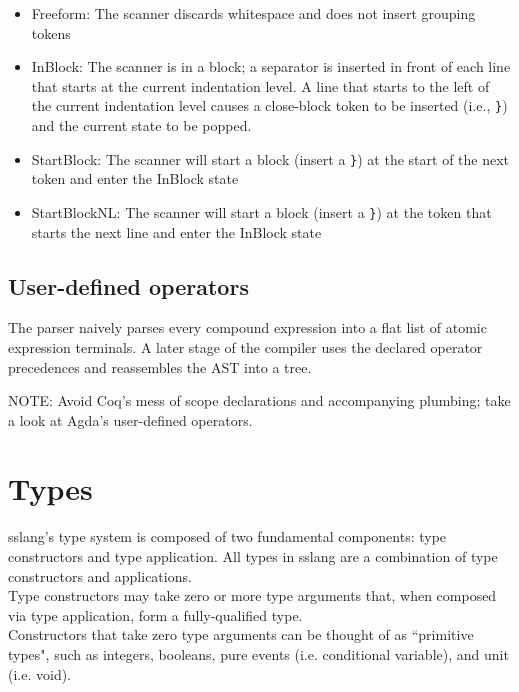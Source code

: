 \documentclass{article}
\begin{document}
\begin{itemize}

\item Freeform: The scanner discards whitespace and does not insert
  grouping tokens

\item InBlock: The scanner is in a block; a separator is inserted in
  front of each line that starts at the current indentation level.  A
  line that starts to the left of the current indentation level causes
  a close-block token to be inserted (i.e., \texttt{\}}) and the
    current state to be popped.

\item StartBlock: The scanner will start a block (insert a \texttt{\}})
at the start of the next token and enter the InBlock state
\item StartBlockNL: The scanner will start a block (insert a
  \texttt{\}}) at the token that starts the next line and enter the InBlock
    state

\end{itemize}

\subsection{User-defined operators}

The parser naively parses every compound expression into a flat list of atomic
expression terminals. A later stage of the compiler uses the declared operator
precedences and reassembles the AST into a tree.

NOTE: Avoid Coq's mess of scope declarations and accompanying plumbing; take
a look at Agda's user-defined operators.

\section{Types}
\noindent sslang's type system is composed of two fundamental components: type constructors and type application. All types in sslang are a combination of type constructors and applications. \\

\noindent Type constructors may take zero or more type arguments that, when composed via type application, form a fully-qualified type. \\ 

\noindent Constructors that take zero type arguments can be thought of as ``primitive types", such as integers, booleans, pure events (i.e. conditional variable), and unit (i.e. void). \\
\end{document}
